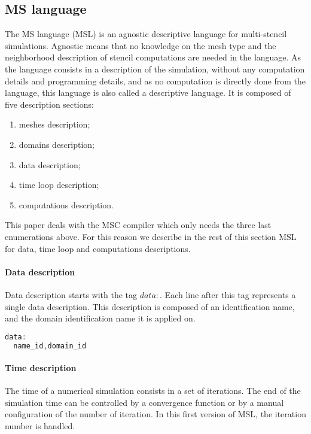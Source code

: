 \subsection{MS language}
The MS language (MSL) is an agnostic descriptive language for multi-stencil simulations. Agnostic means that no knowledge on the mesh type and the neighborhood description of stencil computations are needed in the language. As the language consists in a description of the simulation, without any computation details and programming details, and as no computation is directly done from the language, this language is also called a descriptive language. It is composed of five description sections:
\begin{enumerate}
\item meshes description;
\item domains description;
\item data description;
\item time loop description;
\item computations description.
\end{enumerate}

This paper deals with the MSC compiler which only needs the three last enumerations above. For this reason we describe in the rest of this section MSL for data, time loop and computations descriptions.

\paragraph{Data description} Data description starts with the tag $data:$. Each line after this tag represents a single data description. This description is composed of an identification name, and the domain identification name it is applied on.

\begin{lstlisting}[basicstyle=\footnotesize,mathescape,frame=single,language=C++]
data:
  name_id,domain_id
\end{lstlisting}

\paragraph{Time description} The time of a numerical simulation consists in a set of iterations. The end of the simulation time can be controlled by a convergence function or by a manual configuration of the number of iteration. In this first version of MSL, the iteration number is handled.

